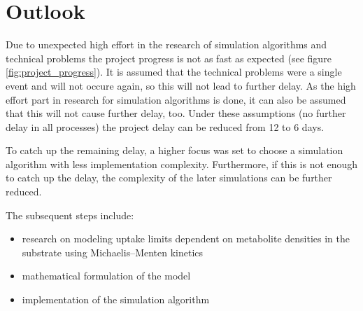 \documentclass[a4paper,10pt]{article}
\begin{document}
\section{Outlook}

Due to unexpected high effort in the research of simulation algorithms and technical problems the project progress is not as fast
as expected (see figure \ref{fig:project_progress}). It is assumed that the technical problems were a single event and will not
occure again, so this will not lead to further delay. As the high effort part in research for simulation algorithms is done, it
can also be assumed that this will not cause further delay, too. Under these assumptions (no further delay in all processes) the
project delay can be reduced from 12 to 6 days.

To catch up the remaining delay, a higher focus was set to choose a simulation algorithm with less implementation complexity.
Furthermore, if this is not enough to catch up the delay, the complexity of the later simulations can be further reduced.

\vspace{0.5cm}
The subsequent steps include:
\begin{itemize}
 \item research on modeling uptake limits dependent on metabolite densities in the substrate using Michaelis–Menten kinetics
 \item mathematical formulation of the model
 \item implementation of the simulation algorithm
\end{itemize}




\newpage

\printbibliography
\end{document}
